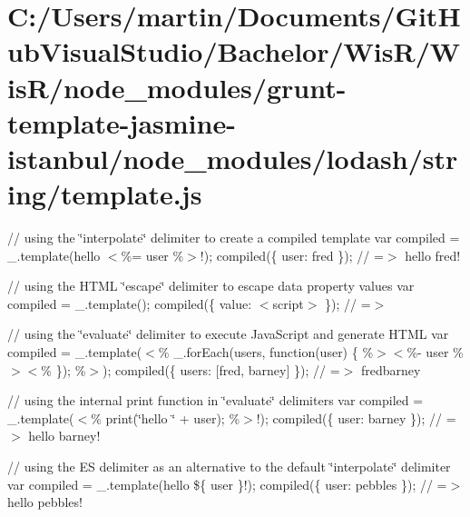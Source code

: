 \hypertarget{_c_1_2_users_2martin_2_documents_2_git_hub_visual_studio_2_bachelor_2_wis_r_2_wis_r_2node_moduleccdd05b6c4baa7b5de77d09f0ab8043a}{}\section{C\+:/\+Users/martin/\+Documents/\+Git\+Hub\+Visual\+Studio/\+Bachelor/\+Wis\+R/\+Wis\+R/node\+\_\+modules/grunt-\/template-\/jasmine-\/istanbul/node\+\_\+modules/lodash/string/template.\+js}
// using the \char`\"{}interpolate\char`\"{} delimiter to create a compiled template var compiled = \+\_\+.\+template(\textquotesingle{}hello $<$\%= user \%$>$!\textquotesingle{}); compiled(\{ \textquotesingle{}user\textquotesingle{}\+: \textquotesingle{}fred\textquotesingle{} \}); // =$>$ \textquotesingle{}hello fred!\textquotesingle{}

// using the H\+T\+M\+L \char`\"{}escape\char`\"{} delimiter to escape data property values var compiled = \+\_\+.\+template(\textquotesingle{}); compiled(\{ \textquotesingle{}value\textquotesingle{}\+: \textquotesingle{}$<$script$>$\textquotesingle{} \}); // =$>$ \textquotesingle{}

// using the \char`\"{}evaluate\char`\"{} delimiter to execute Java\+Script and generate H\+T\+M\+L var compiled = \+\_\+.\+template(\textquotesingle{}$<$\% \+\_\+.\+for\+Each(users, function(user) \{ \%$>$$<$\%-\/ user \%$>$$<$\% \}); \%$>$\textquotesingle{}); compiled(\{ \textquotesingle{}users\textquotesingle{}\+: \mbox{[}\textquotesingle{}fred\textquotesingle{}, \textquotesingle{}barney\textquotesingle{}\mbox{]} \}); // =$>$ \textquotesingle{}fredbarney\textquotesingle{}

// using the internal {\ttfamily print} function in \char`\"{}evaluate\char`\"{} delimiters var compiled = \+\_\+.\+template(\textquotesingle{}$<$\% print(\char`\"{}hello \char`\"{} + user); \%$>$!\textquotesingle{}); compiled(\{ \textquotesingle{}user\textquotesingle{}\+: \textquotesingle{}barney\textquotesingle{} \}); // =$>$ \textquotesingle{}hello barney!\textquotesingle{}

// using the E\+S delimiter as an alternative to the default \char`\"{}interpolate\char`\"{} delimiter var compiled = \+\_\+.\+template(\textquotesingle{}hello \$\{ user \}!\textquotesingle{}); compiled(\{ \textquotesingle{}user\textquotesingle{}\+: \textquotesingle{}pebbles\textquotesingle{} \}); // =$>$ \textquotesingle{}hello pebbles!\textquotesingle{}

